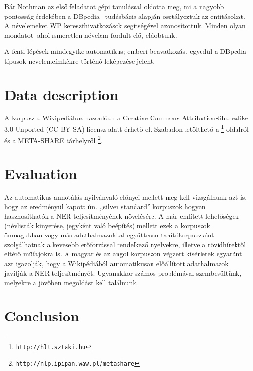 \documentclass{llncs}
\begin{document}
Bár Nothman az első feladatot gépi tanulással oldotta meg, mi a nagyobb
pontosság érdekében a DBpedia~\cite{Bizer:09} tudásbázis alapján osztályoztuk az
entitásokat. A névelemeket WP kereszthivatkozások segítségével azonosítottuk. Minden
olyan mondatot, ahol ismeretlen névelem fordult elő, eldobtunk.

A fenti lépések mindegyike automatikus; emberi beavatkozást egyedül a DBpedia típusok
névelemcímkékre történő leképezése jelent.

\section{Data description}

A korpusz a Wikipediához hasonlóan a Creative Commons Attribution-Sharealike
3.0 Unported (CC-BY-SA) licensz alatt érhető el. Szabadon letölthető a
\footnote{\texttt{http://hlt.sztaki.hu}} oldalról és a META-SHARE tárhelyről
\footnote{\texttt{http://nlp.ipipan.waw.pl/metashare}}.

\section{Evaluation}

Az automatikus annotálás nyilvánvaló előnyei mellett meg kell vizsgálnunk azt is, hogy az eredményül kapott  ún. ,,silver standard'' korpuszok hogyan hasznosíthatók a NER teljesítményének növelésére. A már említett lehetőségek (névlisták kinyerése, jegyként való beépítés) mellett ezek a korpuszok önmagukban vagy más adathalmazokkal együttesen tanítókorpuszként szolgálhatnak a kevesebb erőforrással rendelkező nyelvekre, illetve a rövidhírektől eltérő műfajokra is. A magyar és az angol korpuszon végzett kísérletek egyaránt azt igazolják, hogy a Wikipédiából automatikusan előállított adathalmazok javítják a NER teljesítményét. Ugyanakkor számos problémával szembesültünk, melyekre a jövőben megoldást kell találnunk. 

\section{Conclusion}

\cite{Nothman:08} \cite{Szarvas:06} \cite{Medelyan:09}

%
%


\end{document}
